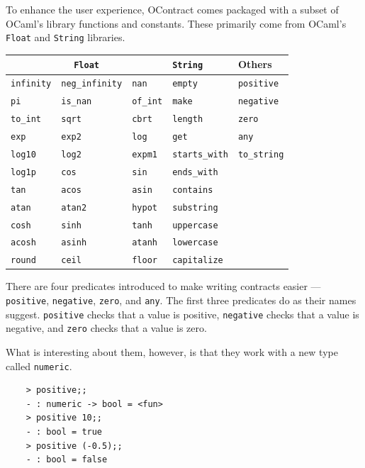 \documentclass[a4paper]{article}
\begin{document}
To enhance the user experience, OContract comes packaged with a subset of OCaml's library functions and constants.
These primarily come from OCaml's \texttt{Float} and \texttt{String} libraries.

\begin{center}
\begin{tabular}{|l|l|l|l|l|}
    \hline
    \multicolumn{3}{|c|}{\texttt{Float}} & \texttt{String} & Others \\ \hline
    \texttt{infinity} & \texttt{neg\_infinity} & \texttt{nan} & \texttt{empty} & \texttt{positive} \\
    \texttt{pi} & \texttt{is\_nan} & \texttt{of\_int} & \texttt{make} & \texttt{negative} \\
    \texttt{to\_int} & \texttt{sqrt} & \texttt{cbrt} & \texttt{length} & \texttt{zero} \\
    \texttt{exp} & \texttt{exp2} & \texttt{log} & \texttt{get} & \texttt{any} \\
    \texttt{log10} & \texttt{log2} & \texttt{expm1} & \texttt{starts\_with} & \texttt{to\_string} \\
    \texttt{log1p} & \texttt{cos} & \texttt{sin} & \texttt{ends\_with} & \\
    \texttt{tan} & \texttt{acos} & \texttt{asin} & \texttt{contains} & \\
    \texttt{atan} & \texttt{atan2} & \texttt{hypot} & \texttt{substring} & \\
    \texttt{cosh} & \texttt{sinh} & \texttt{tanh} & \texttt{uppercase} & \\
    \texttt{acosh} & \texttt{asinh} & \texttt{atanh} & \texttt{lowercase} & \\
    \texttt{round} & \texttt{ceil} & \texttt{floor} & \texttt{capitalize} & \\ \hline
\end{tabular}
\end{center}

There are four predicates introduced to make writing contracts easier --- \texttt{positive}, \texttt{negative}, \texttt{zero}, and \texttt{any}.
The first three predicates do as their names suggest.
\texttt{positive} checks that a value is positive, \texttt{negative} checks that a value is negative, and \texttt{zero} checks that a value is zero.

What is interesting about them, however, is that they work with a new type called \texttt{numeric}.

\begin{verbatim}
    > positive;;
    - : numeric -> bool = <fun>
    > positive 10;;
    - : bool = true
    > positive (-0.5);;
    - : bool = false
\end{verbatim}
\end{document}
